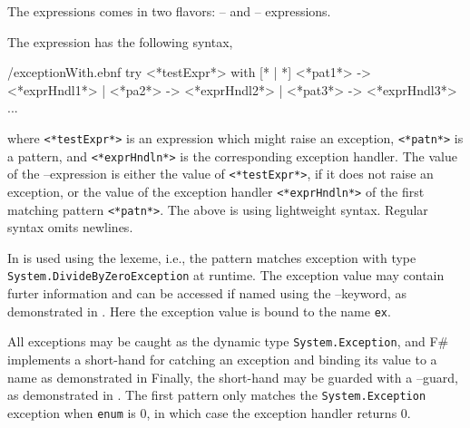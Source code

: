 \documentclass[fsharpNotes.tex]{subfiles}
\begin{document}
The  expressions comes in two flavors: -- and -- expressions.

The  expression has the following syntax,
%
\begin{verbatimwrite}{\ebnf/exceptionWith.ebnf}
try
   <*testExpr*>
with
   [* | *] <*pat1*> -> <*exprHndl1*>
   | <*pa2*> -> <*exprHndl2*>
   | <*pat3*> -> <*exprHndl3*>
   ...
\end{verbatimwrite}
%
where \lstinline[language=syntax]{<*testExpr*>} is an expression which might raise an exception, \lstinline[language=syntax]{<*patn*>} is a pattern, and \lstinline[language=syntax]{<*exprHndln*>} is the corresponding exception handler. The value of the --expression is either the value of \lstinline[language=syntax]{<*testExpr*>}, if it does not raise an exception, or the value of the exception handler \lstinline[language=syntax]{<*exprHndln*>} of the first matching pattern \lstinline[language=syntax]{<*patn*>}. The above is using lightweight syntax. Regular syntax omits newlines.

In   is used using the  lexeme, i.e., the pattern matches exception with type \lstinline{System.DivideByZeroException} at runtime. The exception value may contain furter information and can be accessed if named using the --keyword, as demonstrated in .
%
%
Here the exception value is bound to the name \lstinline{ex}.

All exceptions may be caught as the dynamic type \lstinline{System.Exception}, and F\# implements a short-hand for catching an exception and binding its value to a name as demonstrated in 
%
%
Finally, the short-hand may be guarded with a --guard, as demonstrated in .
%
%
The first pattern only matches the \lstinline{System.Exception} exception when \lstinline{enum} is 0, in which case the exception handler returns 0.
\end{document}
